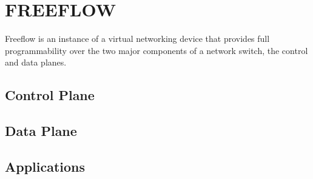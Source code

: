 \chapter{FREEFLOW}
\label{ff}
Freeflow is an instance of a virtual networking device that provides full programmability over the two major components of a network switch, the control and data planes. 

\section{Control Plane}
\label{ff:cp}

\section{Data Plane}
\label{ff:dp}

\section{Applications}
\label{ff:app}

